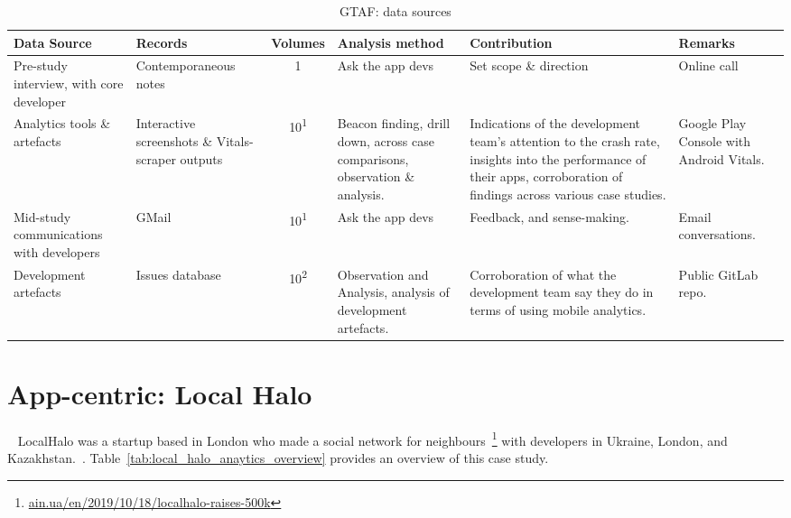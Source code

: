 \begin{table*}
    \centering
    \footnotesize
    \tabcolsep=0.12cm
    \begin{tabular}{L{2.6cm} L{2.4cm} c L{2.75cm} L{3.75cm} L{2cm}}
        Data Source & Records & Volumes & Analysis method &Contribution & Remarks \\
        \toprule
         Pre-study interview, with core developer & Contemporaneous notes\footnotemark & 1 & Ask the app devs & Set scope \& direction & Online call \\
         Analytics tools \& artefacts &Interactive screenshots \& Vitals-scraper outputs &10\textsuperscript{1} & Beacon finding, drill down, across case comparisons, observation \& analysis. & Indications of the development team's attention to the crash rate, insights into the performance of their apps, corroboration of findings across various case studies. & Google Play Console with Android Vitals. \\         
         Mid-study communications with developers & GMail & 10\textsuperscript{1} & Ask the app devs & Feedback, and sense-making.  & Email conversations. \\
         Development artefacts  & Issues database & 10\textsuperscript{2} & Observation and Analysis, analysis of development artefacts. & Corroboration of what the development team say they do in terms of using mobile analytics. & Public GitLab repo. \\
         \bottomrule
    \end{tabular}
    \caption{GTAF: data sources}
    \label{tab:gtaf-data-sources}
\end{table*}






\section{App-centric: Local Halo}~\label{case-study-overview-localhalo}
LocalHalo was a startup based in London who made a social network for neighbours~\footnote{\href{https://ain.ua/en/2019/10/18/localhalo-raises-500k/}{ain.ua/en/2019/10/18/localhalo-raises-500k}} with developers in Ukraine, London, and Kazakhstan.~. 
Table~\ref{tab:local_halo_anaytics_overview} provides an overview of this case study.

